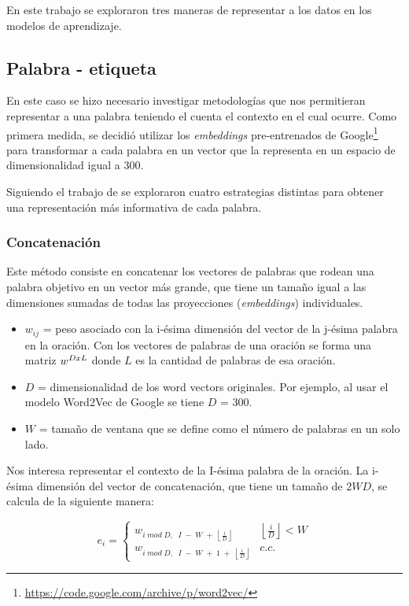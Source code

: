 En este trabajo se exploraron tres maneras de representar a los datos en los
modelos de aprendizaje.

\subsection{Palabra - etiqueta}\label{sec:palabraEtiqueta}

En este caso se hizo necesario investigar metodologías que nos permitieran representar a una palabra teniendo el cuenta el contexto en el cual ocurre. Como primera medida, se decidió utilizar los \textit{embeddings} pre-entrenados de Google\footnote{\url{https://code.google.com/archive/p/word2vec/}} para transformar a cada palabra en un vector que la representa en un espacio de dimensionalidad igual a 300.

Siguiendo el trabajo de \cite{iacobacci-etal-2016-embeddings} se exploraron cuatro estrategias distintas para obtener una representación más informativa de cada palabra.

\subsubsection{Concatenación}
Este método consiste en concatenar los vectores de palabras que rodean una palabra objetivo en un vector más grande, que tiene un tamaño igual a las dimensiones sumadas de todas las proyecciones (\textit{embeddings}) individuales.

\begin{itemize}
    \item $w_{ij}$ = peso asociado con la i-ésima dimensión del vector de la j-ésima palabra en la oración. Con los vectores de palabras de una oración se forma una matriz $w^{\space D\space x\space L}$ donde $L$ es la cantidad de palabras de esa oración.
    \item $D$ = dimensionalidad de los word vectors originales. Por ejemplo, al usar el modelo Word2Vec de Google se tiene $D$ = 300.
    \item $W$ = tamaño de ventana que se define como el número de palabras en un solo lado.
\end{itemize}

Nos interesa representar el contexto de la I-ésima palabra de la oración. La i-ésima dimensión del vector de concatenación, que tiene un tamaño de $2 W D$, se calcula de la siguiente manera:

$$e_{i} =\begin{cases} 
      w_{i \; mod \; D,\;\; I \; - \; W \; + \; \left\lfloor{\frac{i}{D}}\right\rfloor} & \left\lfloor{\frac{i}{D}}\right\rfloor < W \\
      w_{i\; mod \; D,\;\; I \; - \; W \; + \; 1\;  +\;\left\lfloor{\frac{i}{D}}\right\rfloor} & c.c.
   \end{cases}$$


